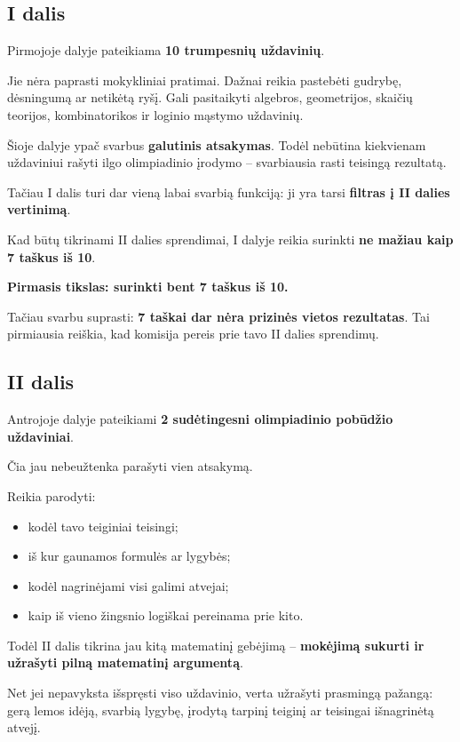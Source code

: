 \documentclass[11pt,a4paper]{article}
\newcommand{\calloutbox}[1]{%
  \begin{center}
  \colorbox{callout}{%
    \parbox{0.94\textwidth}{\centering\bfseries #1}%
  }
  \end{center}
}
\begin{document}
\subsection{I dalis}

Pirmojoje dalyje pateikiama \textbf{10 trumpesnių uždavinių}.

Jie nėra paprasti mokykliniai pratimai. Dažnai reikia pastebėti gudrybę, dėsningumą ar netikėtą ryšį. Gali pasitaikyti algebros, geometrijos, skaičių teorijos, kombinatorikos ir loginio mąstymo uždavinių.

Šioje dalyje ypač svarbus \textbf{galutinis atsakymas}. Todėl nebūtina kiekvienam uždaviniui rašyti ilgo olimpiadinio įrodymo -- svarbiausia rasti teisingą rezultatą.

Tačiau I dalis turi dar vieną labai svarbią funkciją: ji yra tarsi \textbf{filtras į II dalies vertinimą}.

Kad būtų tikrinami II dalies sprendimai, I dalyje reikia surinkti \textbf{ne mažiau kaip 7 taškus iš 10}.

\calloutbox{Pirmasis tikslas: surinkti bent 7 taškus iš 10.}

Tačiau svarbu suprasti: \textbf{7 taškai dar nėra prizinės vietos rezultatas}. Tai pirmiausia reiškia, kad komisija pereis prie tavo II dalies sprendimų.

\subsection{II dalis}

Antrojoje dalyje pateikiami \textbf{2 sudėtingesni olimpiadinio pobūdžio uždaviniai}.

Čia jau nebeužtenka parašyti vien atsakymą.

Reikia parodyti:
\begin{itemize}
  \item kodėl tavo teiginiai teisingi;
  \item iš kur gaunamos formulės ar lygybės;
  \item kodėl nagrinėjami visi galimi atvejai;
  \item kaip iš vieno žingsnio logiškai pereinama prie kito.
\end{itemize}

Todėl II dalis tikrina jau kitą matematinį gebėjimą -- \textbf{mokėjimą sukurti ir užrašyti pilną matematinį argumentą}.

Net jei nepavyksta išspręsti viso uždavinio, verta užrašyti prasmingą pažangą: gerą lemos idėją, svarbią lygybę, įrodytą tarpinį teiginį ar teisingai išnagrinėtą atvejį.
\end{document}

